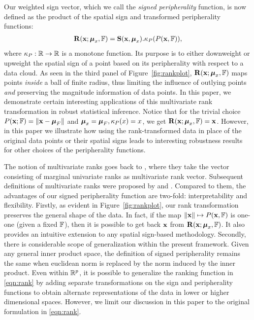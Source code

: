 Our weighted sign vector, which we call the {\it signed peripherality} function, is now defined as the product of the spatial sign and transformed peripherality functions:
%
\begin{align}\label{eqn:rank}
{\mathbf{R}} ({\bf{x}}; {\boldsymbol{\mu}}_x, {\mathbb{F}}) = {\mathbf{S}}({\bf{x}}, {\boldsymbol{\mu}}_x). \kappa_P( P({\bf{x}}, {\mathbb{F}})),
\end{align}
%
where $\kappa_P: {\mathbb{R}} \rightarrow {\mathbb{R}}$ is a monotone function. Its purpose is to either downweight or upweight the spatial sign of a point based on its peripherality with respect to a data cloud. As seen in the third panel of Figure~\ref{fig:rankplot}, ${\mathbf{R}} ({\bf{x}}; {\boldsymbol{\mu}}_x, {\mathbb{F}})$ maps points {\it inside} a ball of finite radius, thus limiting the influence of outlying points {\it and} preserving the magnitude information of data points. In this paper, we demonstrate certain interesting applications of this multivariate rank transformation in robust statistical inference. Notice that for the trivial choice $P( {\bf{x}}; {\mathbb{F}}) = \| {\bf{x}} - {\boldsymbol{\mu}}_{F} \|$ and ${\boldsymbol{\mu}}_x = {\boldsymbol{\mu}}_F, \kappa_P(x)=x$, we get ${\mathbf{R}} ({\bf{x}}; {\boldsymbol{\mu}}_x, {\mathbb{F}}) = {\bf{x}}$. However, in this paper we illustrate how using the rank-transformed data in place of the original data points or their spatial signs leads to interesting robustness results for other choices of the peripherality functions.

The notion of multivariate ranks goes back to \cite{PuriSenBook}, where they take the vector consisting of marginal univariate ranks as multivariate rank vector. Subsequent definitions of multivariate ranks were proposed by \cite{MottonenOja95,HallinPaindaveine02} and \cite{Chernozhukov14}. Compared to them, the advantages of our signed peripherality function are two-fold: interpretability and flexibility. Firstly, as evident in Figure~\ref{fig:rankplot}, our rank transformation preserves the general shape of the data. In fact, if the map $\| {\bf{x}} \| \mapsto P({\bf{x}}, {\mathbb{F}})$ is one-one (given a fixed ${\mathbb{F}}$), then it is possible to get back ${\bf{x}}$ from ${\mathbf{R}} ({\bf{x}}; {\boldsymbol{\mu}}_x, {\mathbb{F}})$. It also provides an intuitive extension to any spatial sign-based methodology. Secondly, there is considerable scope of generalization within the present framework. Given any general inner product space, the definition of signed peripherality remains the same when euclidean norm is replaced by the norm induced by the inner product. Even within ${\mathbb{R}}^p$, it is possible to generalize the ranking function in \eqref{eqn:rank} by adding separate transformations on the sign and peripherality functions to obtain alternate representations of the data in lower or higher dimensional spaces. However, we limit our discussion in this paper to the original formulation in \eqref{eqn:rank}.

